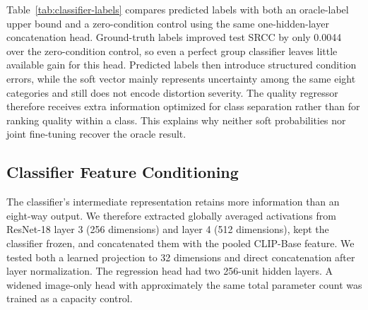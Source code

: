 \documentclass{article}
\begin{document}
Table~\ref{tab:classifier-labels} compares predicted labels with both an oracle-label upper bound and a zero-condition control using the same one-hidden-layer concatenation head. Ground-truth labels improved test SRCC by only 0.0044 over the zero-condition control, so even a perfect group classifier leaves little available gain for this head. Predicted labels then introduce structured condition errors, while the soft vector mainly represents uncertainty among the same eight categories and still does not encode distortion severity. The quality regressor therefore receives extra information optimized for class separation rather than for ranking quality within a class. This explains why neither soft probabilities nor joint fine-tuning recover the oracle result.

\begin{table}[htbp]
\centering
\small
\setlength{\tabcolsep}{5pt}
\caption{CLIP-Base IQA conditioned by ResNet-18 classifier outputs. Test columns are seven-dataset macro averages at the selected validation checkpoint.}
\label{tab:classifier-labels}
\end{table}

\subsection{Classifier Feature Conditioning}

The classifier's intermediate representation retains more information than an eight-way output. We therefore extracted globally averaged activations from ResNet-18 layer 3 (256 dimensions) and layer 4 (512 dimensions), kept the classifier frozen, and concatenated them with the pooled CLIP-Base feature. We tested both a learned projection to 32 dimensions and direct concatenation after layer normalization. The regression head had two 256-unit hidden layers. A widened image-only head with approximately the same total parameter count was trained as a capacity control.
\end{document}
